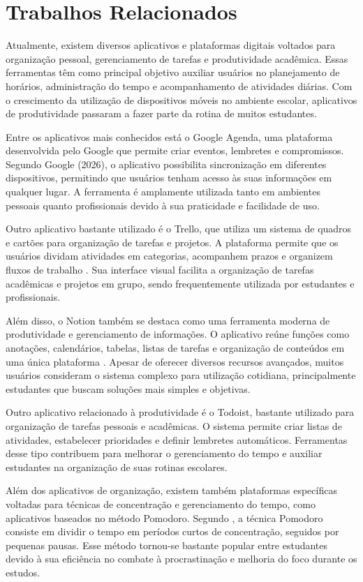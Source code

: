 \documentclass[12pt]{article}
\begin{document}
\section{Trabalhos Relacionados}
Atualmente, existem diversos aplicativos e plataformas digitais voltados para organização pessoal, gerenciamento de tarefas e produtividade acadêmica. Essas ferramentas têm como principal objetivo auxiliar usuários no planejamento de horários, administração do tempo e acompanhamento de atividades diárias. Com o crescimento da utilização de dispositivos móveis no ambiente escolar, aplicativos de produtividade passaram a fazer parte da rotina de muitos estudantes.

Entre os aplicativos mais conhecidos está o Google Agenda, uma plataforma desenvolvida pelo Google que permite criar eventos, lembretes e compromissos. Segundo Google (2026), o aplicativo possibilita sincronização em diferentes dispositivos, permitindo que usuários tenham acesso às suas informações em qualquer lugar. A ferramenta é amplamente utilizada tanto em ambientes pessoais quanto profissionais devido à sua praticidade e facilidade de uso.

Outro aplicativo bastante utilizado é o Trello, que utiliza um sistema de quadros e cartões para organização de tarefas e projetos. A plataforma permite que os usuários dividam atividades em categorias, acompanhem prazos e organizem fluxos de trabalho \cite{trello2026}. Sua interface visual facilita a organização de tarefas acadêmicas e projetos em grupo, sendo frequentemente utilizada por estudantes e profissionais.

Além disso, o Notion também se destaca como uma ferramenta moderna de produtividade e gerenciamento de informações. O aplicativo reúne funções como anotações, calendários, tabelas, listas de tarefas e organização de conteúdos em uma única plataforma \cite{notion2026}. Apesar de oferecer diversos recursos avançados, muitos usuários consideram o sistema complexo para utilização cotidiana, principalmente estudantes que buscam soluções mais simples e objetivas.

Outro aplicativo relacionado à produtividade é o Todoist, bastante utilizado para organização de tarefas pessoais e acadêmicas. O sistema permite criar listas de atividades, estabelecer prioridades e definir lembretes automáticos. Ferramentas desse tipo contribuem para melhorar o gerenciamento do tempo e auxiliar estudantes na organização de suas rotinas escolares.

Além dos aplicativos de organização, existem também plataformas específicas voltadas para técnicas de concentração e gerenciamento do tempo, como aplicativos baseados no método Pomodoro. Segundo , a técnica Pomodoro consiste em dividir o tempo em períodos curtos de concentração, seguidos por pequenas pausas. Esse método tornou-se bastante popular entre estudantes devido à sua eficiência no combate à procrastinação e melhoria do foco durante os estudos.
\end{document}
